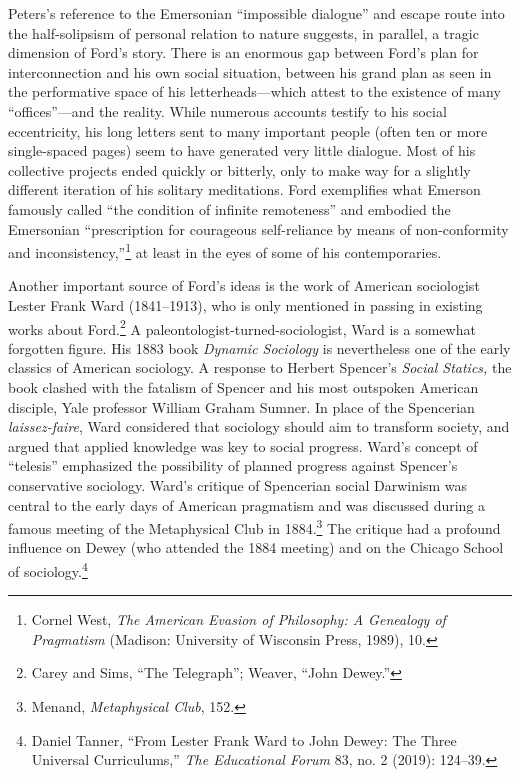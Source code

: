 \documentclass[twoside,symmetric,nobib,justified]{tufte-book}
\begin{document}
Peters's reference to the Emersonian ``impossible dialogue'' and escape
route into the half-solipsism of personal relation to nature suggests,
in parallel, a tragic dimension of Ford's story. There is an enormous
gap between Ford's plan for interconnection and his own social
situation, between his grand plan as seen in the performative space of
his letterheads---which attest to the existence of many
``offices''---and the reality. While numerous accounts testify to his
social eccentricity, his long letters sent to many important people
(often ten or more single-spaced pages) seem to have generated very
little dialogue. Most of his collective projects ended quickly or
bitterly, only to make way for a slightly different iteration of his
solitary meditations. Ford exemplifies what Emerson famously called
``the condition of infinite remoteness'' and embodied the Emersonian
``prescription for courageous self-reliance by means of non-conformity
and inconsistency,''\footnote{Cornel West, \emph{The American Evasion of
  Philosophy: A Genealogy of Pragmatism} (Madison: University of
  Wisconsin Press, 1989), 10.} at least in the eyes of some of his
contemporaries.

Another important source of Ford's ideas is the work of American
sociologist Lester Frank Ward (1841--1913), who is only mentioned in
passing in existing works about Ford.\footnote{Carey and Sims, ``The
  Telegraph''; Weaver, ``John Dewey.''} A
paleontologist-turned-sociologist, Ward is a somewhat forgotten figure.
His 1883 book \emph{Dynamic Sociology} is nevertheless one of the early
classics of American sociology. A response to Herbert Spencer's
\emph{Social Statics,} the book clashed with the fatalism of Spencer and
his most outspoken American disciple, Yale professor William Graham
Sumner. In place of the Spencerian \emph{laissez-faire}, Ward considered
that sociology should aim to transform society, and argued that applied
knowledge was key to social progress. Ward's concept of ``telesis''
emphasized the possibility of planned progress against Spencer's
conservative sociology. Ward's critique of Spencerian social Darwinism
was central to the early days of American pragmatism and was discussed
during a famous meeting of the Metaphysical Club in 1884.\footnote{Menand,
  \emph{Metaphysical Club}, 152.} The critique had a profound influence
on Dewey (who attended the 1884 meeting) and on the Chicago School of
sociology.\footnote{Daniel Tanner, ``From Lester Frank Ward to John
  Dewey: The Three Universal Curriculums,'' \emph{The Educational Forum}
  83, no. 2 (2019): 124--39.}
\end{document}
